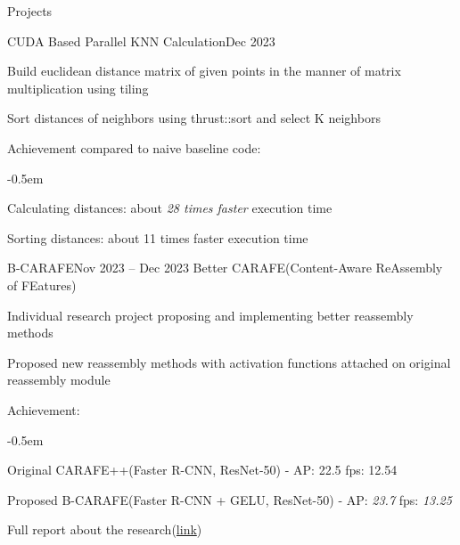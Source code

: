 \documentclass{resume}
\begin{document}
\begin{rSection}{Projects}
\begin{rSubsection}{CUDA Based Parallel KNN Calculation}{Dec 2023}
\begin{list}{--}{\setlength{\rightmargin}{1.5em}}
            \item Build euclidean distance matrix of given points in the manner of matrix multiplication using tiling

            \item Sort distances of neighbors using thrust::sort and select K neighbors
        \end{list}

        \item Achievement compared to naive baseline code:
        \vspace{-0.5em}
        \begin{list}{--}{\setlength{\rightmargin}{1.5em}}
            \itemsep -0.5em

            \item Calculating distances: about \emph{28 times faster} execution time

            \item Sorting distances: about 11 times faster execution time
        \end{list}
    \end{rSubsection}

    \begin{rSubsection}{B-CARAFE}{Nov 2023 -- Dec 2023}
        Better CARAFE(Content-Aware ReAssembly of FEatures)

        \item Individual research project proposing and implementing better reassembly methods

        \item Proposed new reassembly methods with activation functions attached on original reassembly module

        \item Achievement:
        \vspace{-0.5em}
        \begin{list}{--}{\setlength{\rightmargin}{1.5em}}
            \itemsep -0.5em

            \item Original CARAFE++(Faster R-CNN, ResNet-50) - AP: 22.5 fps: 12.54
            
            \item Proposed B-CARAFE(Faster R-CNN + GELU, ResNet-50) - AP: \emph{23.7} fps: \emph{13.25}
        \end{list}

        \item Full report about the research(\href{https://github.com/minsusun/csed539/blob/main/main.pdf}{link})


\end{rSubsection}
\end{rSection}
\end{document}
